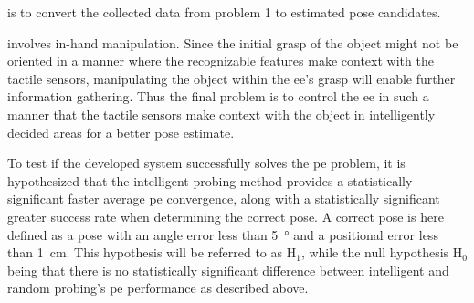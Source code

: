 \begin{problem} \label{prob:2}
	\normalfont is to convert the collected data from problem 1 to estimated pose candidates.
\end{problem}

\begin{problem} \label{prob:3}
	\normalfont involves in-hand manipulation. Since the initial grasp of the object might not be oriented in a manner where the recognizable features make context with the tactile sensors, manipulating the object within the \gls{ee}'s grasp will enable further information gathering. Thus the final problem is to control the \gls{ee} in such a manner that the tactile sensors make context with the object in intelligently decided areas for a better pose estimate.
\end{problem}

To test if the developed system successfully solves the \gls{pe} problem, it is hypothesized that the intelligent probing method provides a statistically significant faster average \gls{pe} convergence, along with a statistically significant greater success rate when determining the correct pose. A correct pose is here defined as a pose with an angle error less than \SI{5}{\degree} and a positional error less than \SI{1}{\centi\meter}. This hypothesis will be referred to as $\text{H}_1$, while the null hypothesis $\text{H}_0$ being that there is no statistically significant difference between intelligent and random probing's \gls{pe} performance as described above.





